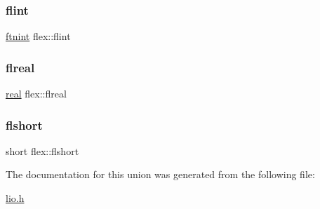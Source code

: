 \mbox{\label{unionflex_ad06dfacd03549adce1a9d063a2067019}} 
\subsubsection{\texorpdfstring{flint}{flint}}
{\footnotesize\ttfamily \hyperlink{dependencies_2third-party_2clapack_23_82_81_2_f2_c_l_i_b_s_2libf2c_2f2c_8h_a9d70cdb573fb2bf020e1f6dba85fb1cc}{ftnint} flex\+::flint}

\mbox{\label{unionflex_a68fa92e241f7d010a94a4289c7339a16}} 
\subsubsection{\texorpdfstring{flreal}{flreal}}
{\footnotesize\ttfamily \hyperlink{dependencies_2third-party_2clapack_23_82_81_2_f2_c_l_i_b_s_2libf2c_2f2c_8h_a031f8951175b43076c2084a6c2173410}{real} flex\+::flreal}

\mbox{\label{unionflex_ae01aaf5ced8d300a0e2fe2fee733e009}} 
\subsubsection{\texorpdfstring{flshort}{flshort}}
{\footnotesize\ttfamily short flex\+::flshort}



The documentation for this union was generated from the following file\+:\begin{DoxyCompactItemize}
\item 
\hyperlink{lio_8h}{lio.\+h}\end{DoxyCompactItemize}
